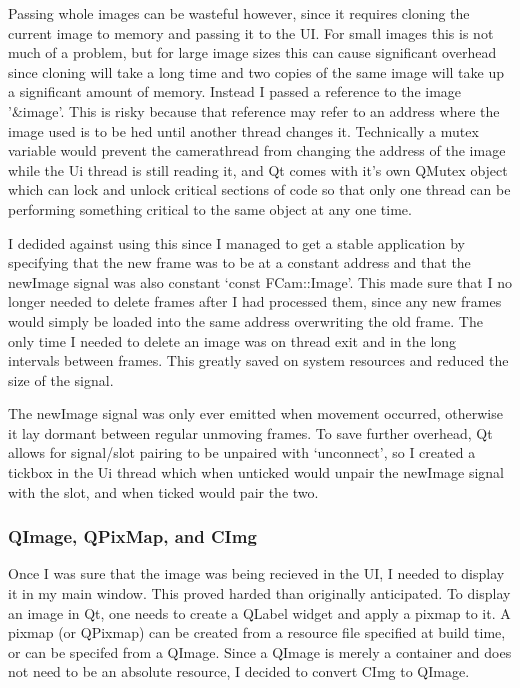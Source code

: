 Passing whole images can be wasteful however, since it requires cloning the current image to memory and passing it to the UI. For small images this is not much of a problem, but for large image sizes this can cause significant overhead since cloning will take a long time and two copies of the same image will take up a significant amount of memory. Instead I passed a reference to the image '\&image'. This is risky because that reference may refer to an address where the image used is to be hed until another thread changes it. Technically a mutex variable would prevent the camerathread from changing the address of the image while the Ui thread is still reading it, and Qt comes with it’s own QMutex object which can lock and unlock critical sections of code so that only one thread can be performing something critical to the same object at any one time.

I dedided against using this since I managed to get a stable application by specifying that the new frame was to be at a constant address and that the newImage signal was also constant ‘const FCam::Image’. This made sure that I no longer needed to delete frames after I had processed them, since any new frames would simply be loaded into the same address overwriting the old frame. The only time I needed to delete an image was on thread exit and in the long intervals between frames. This greatly saved on system resources and reduced the size of the signal.

The newImage signal was only ever emitted when movement occurred, otherwise it lay dormant between regular unmoving frames.
To save further overhead, Qt allows for signal/slot pairing to be unpaired with ‘unconnect’, so I created a tickbox in the Ui thread which when unticked would unpair the newImage signal with the slot, and when ticked would pair the two.

\subsubsection{QImage, QPixMap, and CImg}
Once I was sure that the image was being recieved in the UI, I needed to display it in my main window. This proved harded than originally anticipated. To display an image in Qt, one needs to create a QLabel widget and apply a pixmap to it. A pixmap (or QPixmap) can be created from a resource file specified at build time, or can be specifed from a QImage. Since a QImage is merely a container and does not need to be an absolute resource, I decided to convert CImg to QImage. 

